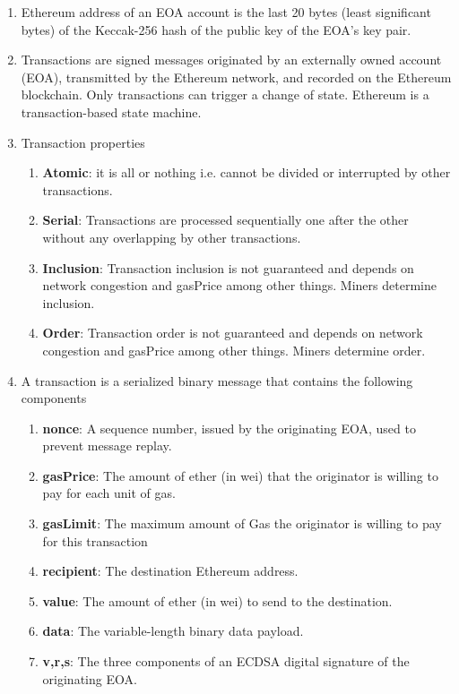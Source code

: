 \begin{enumerate}
\item Ethereum address of an EOA account is the last 20 bytes (least significant bytes) of the Keccak-256 hash of the public key of the EOA's key pair.

\item Transactions are signed messages originated by an externally owned account (EOA), transmitted by the Ethereum network, and recorded on the Ethereum blockchain. Only transactions can trigger a change of state. Ethereum is a transaction-based state machine.

\item Transaction properties
\begin{enumerate}
\item\textbf{Atomic}: it is all or nothing i.e. cannot be divided or interrupted by other transactions.
\item\textbf{Serial}: Transactions are processed sequentially one after the other without any overlapping by other transactions.
\item\textbf{Inclusion}: Transaction inclusion is not guaranteed and depends on network congestion and gasPrice among other things. Miners determine inclusion.
\item\textbf{Order}: Transaction order is not guaranteed and depends on network congestion and gasPrice among other things. Miners determine order.
\end{enumerate}

\item A transaction is a serialized binary message that contains the following components
\begin{enumerate}
\item\textbf{nonce}: A sequence number, issued by the originating EOA, used to prevent message replay.
\item\textbf{gasPrice}: The amount of ether (in wei) that the originator is willing to pay for each unit of gas.
\item\textbf{gasLimit}: The maximum amount of Gas the originator is willing to pay for this transaction
\item\textbf{recipient}: The destination Ethereum address.
\item\textbf{value}: The amount of ether (in wei) to send to the destination.
\item\textbf{data}: The variable-length binary data payload.
\item\textbf{v,r,s}: The three components of an ECDSA digital signature of the originating EOA.
\end{enumerate}


\end{enumerate}
